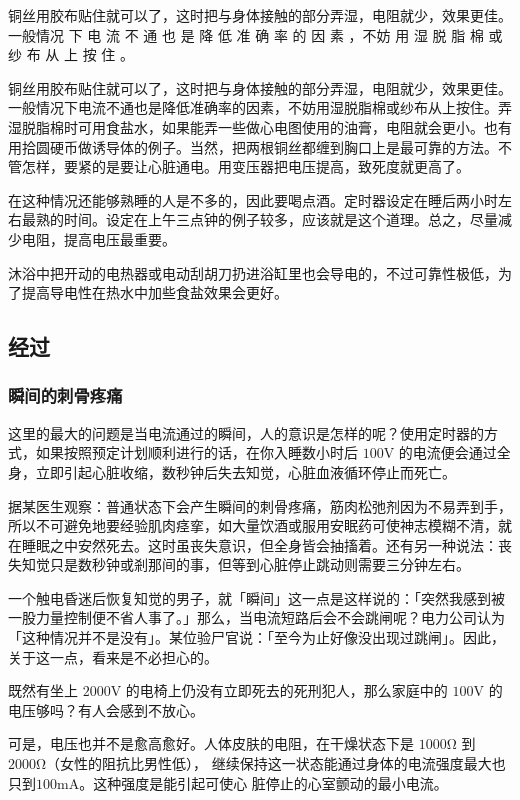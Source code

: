 \documentclass[UTF8]{ctexart}
\begin{document}
铜丝用胶布贴住就可以了，这时把与身体接触的部分弄湿，电阻就少，效果更佳。一般情况 下 电 流 不 通 也 是 降 低 准 确 率 的 因 素 ，不妨 用 湿 脱 脂 棉 或 纱 布 从 上 按 住 。

铜丝用胶布贴住就可以了，这时把与身体接触的部分弄湿，电阻就少，效果更佳。一般情况下电流不通也是降低准确率的因素，不妨用湿脱脂棉或纱布从上按住。弄湿脱脂棉时可用食盐水，如果能弄一些做心电图使用的油膏，电阻就会更小。也有用拾圆硬币做诱导体的例子。当然，把两根铜丝都缠到胸口上是最可靠的方法。不管怎样，要紧的是要让心脏通电。用变压器把电压提高，致死度就更高了。

在这种情况还能够熟睡的人是不多的，因此要喝点酒。定时器设定在睡后两小时左右最熟的时间。设定在上午三点钟的例子较多，应该就是这个道理。总之，尽量减少电阻，提高电压最重要。

沐浴中把开动的电热器或电动刮胡刀扔进浴缸里也会导电的，不过可靠性极低，为了提高导电性在热水中加些食盐效果会更好。

\subsection{经过}

\subsubsection*{瞬间的刺骨疼痛}

这里的最大的问题是当电流通过的瞬间，人的意识是怎样的呢？使用定时器的方式，如果按照预定计划顺利进行的话，在你入睡数小时后 $100\si{\volt}$ 的电流便会通过全身，立即引起心脏收缩，数秒钟后失去知觉，心脏血液循环停止而死亡。

据某医生观察：普通状态下会产生瞬间的刺骨疼痛，筋肉松弛剂因为不易弄到手，所以不可避免地要经验肌肉痉挛，如大量饮酒或服用安眠药可使神志模糊不清，就在睡眠之中安然死去。这时虽丧失意识，但全身皆会抽搐着。还有另一种说法：丧失知觉只是数秒钟或剎那间的事，但等到心脏停止跳动则需要三分钟左右。

一个触电昏迷后恢复知觉的男子，就「瞬间」这一点是这样说的：「突然我感到被一股力量控制便不省人事了。」那么，当电流短路后会不会跳闸呢？电力公司认为「这种情况并不是没有」。某位验尸官说：「至今为止好像没出现过跳闸」。因此，关于这一点，看来是不必担心的。

既然有坐上 $2000\si{\volt}$ 的电椅上仍没有立即死去的死刑犯人，那么家庭中的 $100\si{\volt}$ 的电压够吗？有人会感到不放心。

可是，电压也并不是愈高愈好。人体皮肤的电阻，在干燥状态下是 $1000\si{\ohm}$ 到 $2000\si{\ohm}$（女性的阻抗比男性低），
继续保持这一状态能通过身体的电流强度最大也只到$100\si{\milli\ampere}$。这种强度是能引起可使心
脏停止的心室颤动的最小电流。
\end{document}
